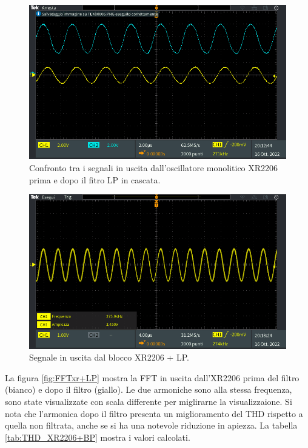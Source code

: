 \documentclass[titlepage]{report}
\begin{document}

	\begin{figure}[H]
		\centering
		\includegraphics[scale=0.5]{Immagini/sin_xr+lp.PNG}
		\caption{Confronto tra i segnali in uscita dall'oscillatore monolitico XR2206 prima e dopo il fitro LP in cascata.}
		\label{fig:SINxr+LP}
	\end{figure}


	\begin{figure}[H]
		\centering
		\includegraphics[scale=0.5]{Immagini/sin_xr.PNG}
		\caption{Segnale in uscita dal blocco XR2206 + LP.}
		\label{fig:SINx}
	\end{figure}

	La figura \ref{fig:FFTxr+LP} mostra la FFT in uscita dall'XR2206 prima del filtro (bianco) e dopo il filtro (giallo). Le due armoniche sono alla stessa frequenza, sono state visualizzate con scala differente per miglirarne la visualizzaione. Si nota che l'armonica dopo il filtro presenta un miglioramento del THD rispetto a quella non filtrata, anche se si ha una notevole riduzione in apiezza. La tabella \ref{tab:THD_XR2206+BP} mostra i valori calcolati.
\end{document}

